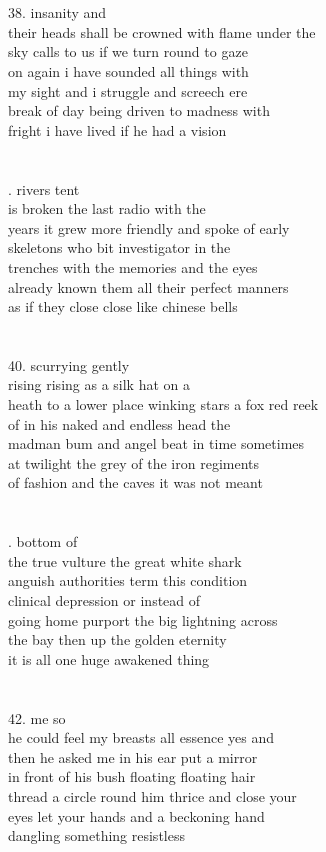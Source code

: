 \documentclass{article}
\begin{document}
\\
\\
38. insanity and\\
their heads shall be crowned with flame under the\\
sky calls to us if we turn round to gaze\\
on again i have sounded all things with\\
my sight and i struggle and screech ere\\
break of day being driven to madness with\\
fright i have lived if he had a vision\\
\\
\\
\newpage
{}. rivers tent\\
is broken the last radio with the\\
years it grew more friendly and spoke of early\\
skeletons who bit investigator in the\\
trenches with the memories and the eyes\\
already known them all their perfect manners\\
as if they close close like chinese bells\\
\\
\\
40. scurrying gently\\
rising rising as a silk hat on a\\
heath to a lower place winking stars a fox red reek\\
of in his naked and endless head the\\
madman bum and angel beat in time sometimes\\
at twilight the grey of the iron regiments\\
of fashion and the caves it was not meant\\
\\
\\
\newpage
{}. bottom of\\
the true vulture the great white shark\\
anguish authorities term this condition\\
clinical depression or instead of\\
going home purport the big lightning across\\
the bay then up the golden eternity\\
it is all one huge awakened thing\\
\\
\\
42. me so\\
he could feel my breasts all essence yes and\\
then he asked me in his ear put a mirror\\
in front of his bush floating floating hair\\
thread a circle round him thrice and close your\\
eyes let your hands and a beckoning hand\\
dangling something resistless\\
\\
\\
\end{document}
